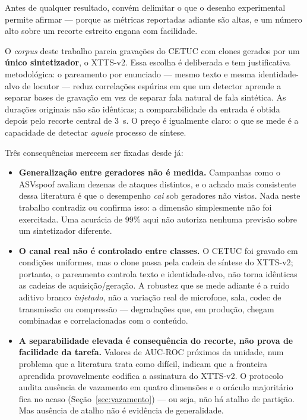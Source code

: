 \documentclass[12pt,a4paper]{article}
\begin{document}
Antes de qualquer resultado, convém delimitar o que o desenho experimental
permite afirmar --- porque as métricas reportadas adiante são altas, e um
número alto sobre um recorte estreito engana com facilidade.

O \textit{corpus} deste trabalho pareia gravações do CETUC com clones gerados
por um \textbf{único sintetizador}, o XTTS-v2. Essa escolha é deliberada e tem
justificativa metodológica: o pareamento por enunciado --- mesmo texto e mesma
identidade-alvo de locutor --- reduz correlações espúrias em que um detector aprende a separar
bases de gravação em vez de separar fala natural de fala sintética. As durações
originais não são idênticas; a comparabilidade da entrada é obtida depois pelo
recorte central de \SI{3}{\second}. O preço é igualmente claro: o que se mede é a
capacidade de detectar \emph{aquele} processo de síntese.

Três consequências merecem ser fixadas desde já:

\begin{itemize}
	\item \textbf{Generalização entre geradores não é medida.} Campanhas como
	o ASVspoof avaliam dezenas de ataques distintos, e o achado mais
	consistente dessa literatura é que o desempenho \emph{cai} sob geradores
	não vistos. Nada neste trabalho contradiz ou confirma isso: a dimensão
	simplesmente não foi exercitada. Uma acurácia de \num{99}\% aqui não
	autoriza nenhuma previsão sobre um sintetizador diferente.
	\item \textbf{O canal real não é controlado entre classes.} O CETUC foi gravado
	em condições uniformes, mas o clone passa pela cadeia de síntese do XTTS-v2;
	portanto, o pareamento controla texto e identidade-alvo, não torna idênticas as
	cadeias de aquisição/geração. A robustez que se mede adiante é a ruído aditivo
	branco \emph{injetado}, não a variação real de microfone, sala, codec de
	transmissão ou compressão --- degradações que, em produção, chegam
	combinadas e correlacionadas com o conteúdo.
	\item \textbf{A separabilidade elevada é consequência do recorte, não
		prova de facilidade da tarefa.} Valores de AUC-ROC próximos da unidade,
	num problema que a literatura trata como difícil, indicam que a fronteira
	aprendida provavelmente codifica a assinatura do XTTS-v2. O protocolo
	audita ausência de vazamento em quatro dimensões e o oráculo majoritário
	fica no acaso (Seção~\ref{sec:vazamento}) --- ou seja, não há atalho de
	partição. Mas ausência de atalho não é evidência de generalidade.
\end{itemize}
\end{document}
